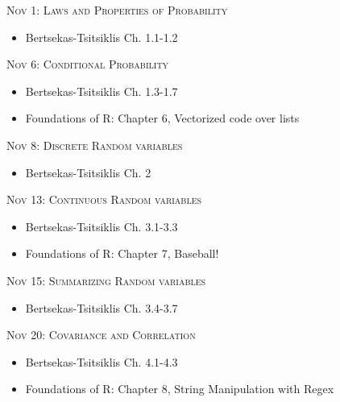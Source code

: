 \documentclass[11pt]{article}
\begin{document}
\newpage

\noindent \textsc{Nov 1: Laws and Properties of Probability}

\begin{itemize}

\item Bertsekas-Tsitsiklis Ch. 1.1-1.2 


\end{itemize}

\noindent \textsc{Nov 6: Conditional Probability}

\begin{itemize}

\item Bertsekas-Tsitsiklis Ch. 1.3-1.7

\item Foundations of R: Chapter 6, Vectorized code over lists

\end{itemize}

\noindent \textsc{Nov 8: Discrete Random variables }

\begin{itemize}

 \item Bertsekas-Tsitsiklis Ch. 2  
 


\end{itemize}


\noindent \textsc{Nov 13: Continuous Random variables}

\begin{itemize}
\item Bertsekas-Tsitsiklis Ch. 3.1-3.3 

\item Foundations of R: Chapter 7, Baseball!

\end{itemize}


\noindent \textsc{Nov 15: Summarizing Random variables}

\begin{itemize}
\item Bertsekas-Tsitsiklis Ch. 3.4-3.7 

\end{itemize}

\noindent \textsc{Nov 20: Covariance and Correlation}

\begin{itemize}

 \item Bertsekas-Tsitsiklis Ch. 4.1-4.3
 
 
\item Foundations of R: Chapter 8, String Manipulation with Regex
 
\end{itemize}
\end{document}

